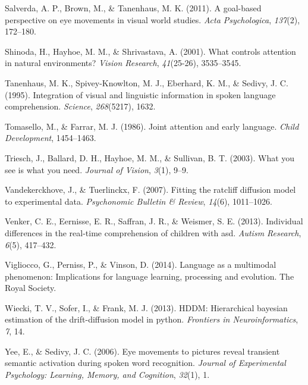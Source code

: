 \documentclass[,man,floatsintext]{apa6}
\begin{document}
\leavevmode\hypertarget{ref-salverda2011goal}{}%
Salverda, A. P., Brown, M., \& Tanenhaus, M. K. (2011). A goal-based
perspective on eye movements in visual world studies. \emph{Acta
Psychologica}, \emph{137}(2), 172--180.

\leavevmode\hypertarget{ref-shinoda2001controls}{}%
Shinoda, H., Hayhoe, M. M., \& Shrivastava, A. (2001). What controls
attention in natural environments? \emph{Vision Research},
\emph{41}(25-26), 3535--3545.

\leavevmode\hypertarget{ref-tanenhaus1995integration}{}%
Tanenhaus, M. K., Spivey-Knowlton, M. J., Eberhard, K. M., \& Sedivy, J.
C. (1995). Integration of visual and linguistic information in spoken
language comprehension. \emph{Science}, \emph{268}(5217), 1632.

\leavevmode\hypertarget{ref-tomasello1986joint}{}%
Tomasello, M., \& Farrar, M. J. (1986). Joint attention and early
language. \emph{Child Development}, 1454--1463.

\leavevmode\hypertarget{ref-triesch2003you}{}%
Triesch, J., Ballard, D. H., Hayhoe, M. M., \& Sullivan, B. T. (2003).
What you see is what you need. \emph{Journal of Vision}, \emph{3}(1),
9--9.

\leavevmode\hypertarget{ref-vandekerckhove2007fitting}{}%
Vandekerckhove, J., \& Tuerlinckx, F. (2007). Fitting the ratcliff
diffusion model to experimental data. \emph{Psychonomic Bulletin \&
Review}, \emph{14}(6), 1011--1026.

\leavevmode\hypertarget{ref-venker2013individual}{}%
Venker, C. E., Eernisse, E. R., Saffran, J. R., \& Weismer, S. E.
(2013). Individual differences in the real-time comprehension of
children with asd. \emph{Autism Research}, \emph{6}(5), 417--432.

\leavevmode\hypertarget{ref-vigliocco2014language}{}%
Vigliocco, G., Perniss, P., \& Vinson, D. (2014). Language as a
multimodal phenomenon: Implications for language learning, processing
and evolution. The Royal Society.

\leavevmode\hypertarget{ref-wiecki2013hddm}{}%
Wiecki, T. V., Sofer, I., \& Frank, M. J. (2013). HDDM: Hierarchical
bayesian estimation of the drift-diffusion model in python.
\emph{Frontiers in Neuroinformatics}, \emph{7}, 14.

\leavevmode\hypertarget{ref-yee2006eye}{}%
Yee, E., \& Sedivy, J. C. (2006). Eye movements to pictures reveal
transient semantic activation during spoken word recognition.
\emph{Journal of Experimental Psychology: Learning, Memory, and
Cognition}, \emph{32}(1), 1.
\end{document}

